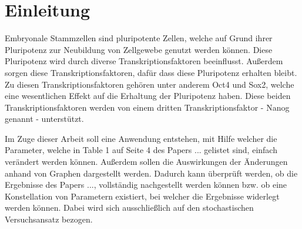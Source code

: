\chapter{Einleitung}
\label{ch:intro}
Embryonale Stammzellen sind pluripotente Zellen, welche auf Grund ihrer Pluripotenz zur Neubildung von Zellgewebe genutzt werden können.
Diese Pluripotenz wird durch diverse Transkriptionsfaktoren beeinflusst. 
Außerdem sorgen diese Transkriptionsfaktoren, dafür dass diese Pluripotenz erhalten bleibt. 
Zu diesen Transkriptionsfaktoren gehören unter anderem Oct4 und Sox2, welche eine wesentlichen Effekt auf die Erhaltung der Pluripotenz haben.
Diese beiden Transkriptionsfaktoren werden von einem dritten Transkriptionsfaktor - Nanog genannt - unterstützt.



 
Im Zuge dieser Arbeit soll eine Anwendung entstehen, mit Hilfe welcher die Parameter, welche in Table 1 auf Seite 4 des Papers ... gelistet sind, einfach verändert werden können.
Außerdem sollen die Auswirkungen der Änderungen anhand von Graphen dargestellt werden. 
Dadurch kann überprüft werden, ob die Ergebnisse des Papers ..., vollständig nachgestellt werden können bzw. ob eine Konstellation von Parametern existiert, bei welcher die Ergebnisse widerlegt werden können. Dabei wird sich ausschließlich auf den stochastischen Versuchsansatz bezogen.

